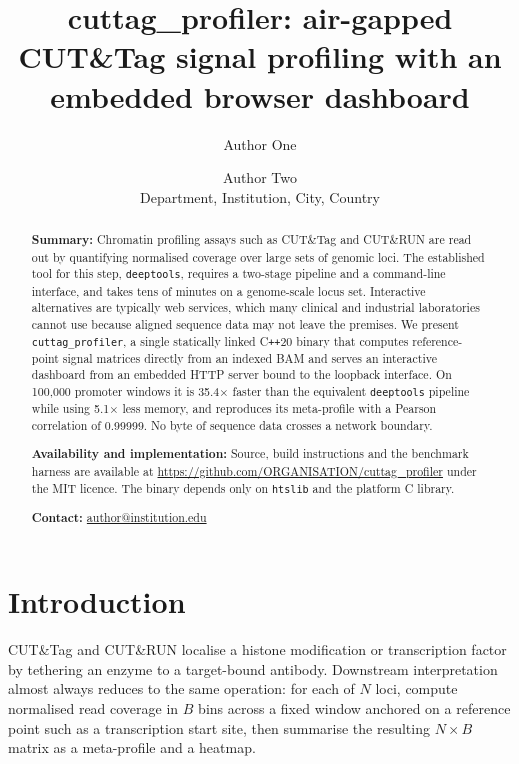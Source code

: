 \documentclass[11pt,a4paper]{article}
\title{\vspace{-1.5cm}\textbf{cuttag\_profiler: air-gapped CUT\&Tag signal
profiling with an embedded browser dashboard}}
\author{Author One \and Author Two \\[2pt]
\small Department, Institution, City, Country}
\date{}
\newcommand{\NumRegions}{100{,}000}
\newcommand{\SpeedupTotal}{35.4}
\newcommand{\MemRatio}{5.1}
\newcommand{\ProfileR}{0.99999}
\begin{document}
\maketitle
\vspace{-1cm}

\begin{abstract}
\noindent\textbf{Summary:} Chromatin profiling assays such as CUT\&Tag and
CUT\&RUN are read out by quantifying normalised coverage over large sets of
genomic loci. The established tool for this step, \texttt{deeptools}, requires
a two-stage pipeline and a command-line interface, and takes tens of minutes on
a genome-scale locus set. Interactive alternatives are typically web services,
which many clinical and industrial laboratories cannot use because aligned
sequence data may not leave the premises. We present \texttt{cuttag\_profiler},
a single statically linked C\texttt{++}20 binary that computes reference-point
signal matrices directly from an indexed BAM and serves an interactive
dashboard from an embedded HTTP server bound to the loopback interface. On
\NumRegions{} promoter windows it is \SpeedupTotal$\times$ faster than the
equivalent \texttt{deeptools} pipeline while using \MemRatio$\times$ less
memory, and reproduces its meta-profile with a Pearson correlation of
\ProfileR. No byte of sequence data crosses a network boundary.

\smallskip
\noindent\textbf{Availability and implementation:} Source, build instructions
and the benchmark harness are available at
\url{https://github.com/ORGANISATION/cuttag_profiler} under the MIT licence.
The binary depends only on \texttt{htslib} and the platform C library.

\smallskip
\noindent\textbf{Contact:} \url{author@institution.edu}
\end{abstract}

\section{Introduction}

CUT\&Tag \citep{kayajaya2019} and CUT\&RUN \citep{skene2017} localise a histone
modification or transcription factor by tethering an enzyme to a target-bound
antibody. Downstream interpretation almost always reduces to the same
operation: for each of $N$ loci, compute normalised read coverage in $B$ bins
across a fixed window anchored on a reference point such as a transcription
start site, then summarise the resulting $N \times B$ matrix as a meta-profile
and a heatmap.
\end{document}
